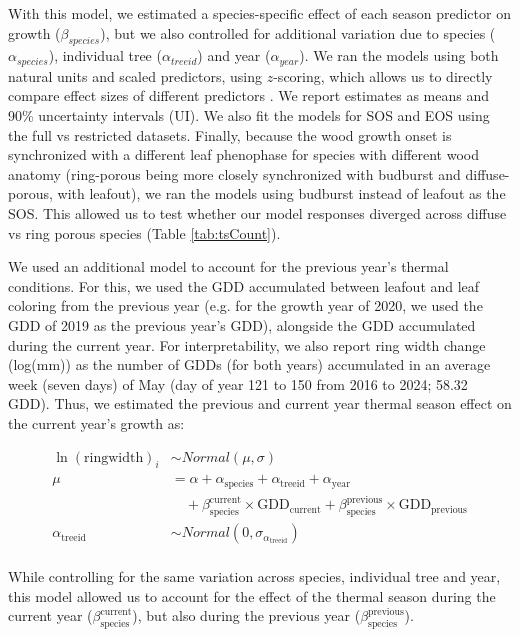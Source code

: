 With this model, we estimated a species-specific effect of each season predictor on growth ($\beta_{species}$), but we also controlled for additional variation due to species ($\alpha_{species}$), individual tree ($\alpha_{treeid}$) and year ($\alpha_{year}$). We ran the models using both natural units and scaled predictors, using $z$-scoring, which allows us to directly compare effect sizes of different predictors \citep{gelman_data_2006}. We report estimates as means and 90\% uncertainty intervals (UI). We also fit the models for SOS and EOS using the full vs restricted datasets. Finally, because the wood growth onset is synchronized with a different leaf phenophase for species with different wood anatomy (ring-porous being more closely synchronized with budburst and diffuse-porous, with leafout), we ran the models using budburst instead of leafout as the SOS. This allowed us to test whether our model responses diverged across diffuse vs ring porous species (Table \ref{tab:tsCount}). 

We used an additional model to account for the previous year's thermal conditions. For this, we used the GDD accumulated between leafout and leaf coloring from the previous year (e.g. for the growth year of 2020, we used the GDD of 2019 as the previous year's GDD), alongside the GDD accumulated during the current year. For interpretability, we also report ring width change (log(mm)) as the number of GDDs (for both years) accumulated in an average week (seven days) of May (day of year 121 to 150 from 2016 to 2024; 58.32 GDD). Thus, we estimated the previous and current year thermal season effect on the current year's growth as:

\begin{equation}
\begin{aligned} 
\ln(\text{ringwidth})_i &\sim Normal(\mu, \sigma) \\
\mu &= \alpha + \alpha_{\text{species}} + \alpha_{\text{treeid}} + \alpha_{\text{year}} \\
    &\quad + \beta_{\text{species}}^{\text{current}} \times \text{GDD}_{\text{current}}
           + \beta_{\text{species}}^{\text{previous}} \times \text{GDD}_{\text{previous}} \\
\alpha_{\text{treeid}} &\sim Normal(0, \sigma_{\alpha_{\text{treeid}}}) \\
\end{aligned}
\label{eq:prvsYrMdl}
\end{equation}

While controlling for the same variation across species, individual tree and year, this model allowed us to account for the effect of the thermal season during the current year ($\beta_{\text{species}}^{\text{current}}$), but also during the previous year ($\beta_{\text{species}}^{\text{previous}}$). 

